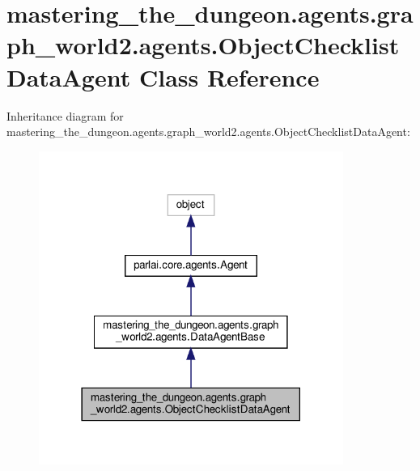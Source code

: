 \hypertarget{classmastering__the__dungeon_1_1agents_1_1graph__world2_1_1agents_1_1ObjectChecklistDataAgent}{}\section{mastering\+\_\+the\+\_\+dungeon.\+agents.\+graph\+\_\+world2.\+agents.\+Object\+Checklist\+Data\+Agent Class Reference}
\label{classmastering__the__dungeon_1_1agents_1_1graph__world2_1_1agents_1_1ObjectChecklistDataAgent}


Inheritance diagram for mastering\+\_\+the\+\_\+dungeon.\+agents.\+graph\+\_\+world2.\+agents.\+Object\+Checklist\+Data\+Agent\+:
\nopagebreak
\begin{figure}[H]
\begin{center}
\leavevmode
\includegraphics[width=282pt]{classmastering__the__dungeon_1_1agents_1_1graph__world2_1_1agents_1_1ObjectChecklistDataAgent__inherit__graph}
\end{center}
\end{figure}


